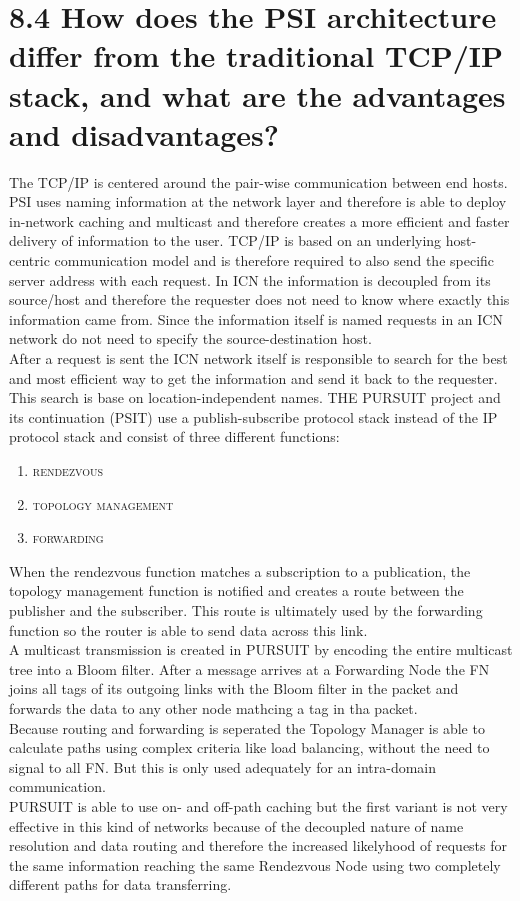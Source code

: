 \documentclass{article}
\begin{document}
	\section*{8.4 How does the PSI architecture differ from the traditional TCP/IP stack, and what are the advantages and disadvantages?}
	\begin{adjustwidth}{2em}{2em}
		The TCP/IP is centered around the pair-wise communication between end hosts. PSI uses naming information at the network layer and therefore is able to deploy in-network caching and multicast and therefore creates a more efficient and faster delivery of information to the user. TCP/IP is based on an underlying host-centric communication model and is therefore required to also send the specific server address with each request. In ICN the information is decoupled from its source/host and therefore the requester does not need to know where exactly this information came from. Since the information itself is named requests in an ICN network do not need to specify the source-destination host. \\
		After a request is sent the ICN network itself is responsible to search for the best and most efficient way to get the information and send it back to the requester. This search is base on location-independent names.
		THE PURSUIT project and its continuation (PSIT) use a publish-subscribe protocol stack instead of the IP protocol stack and consist of three different functions:
		\begin{enumerate}[\small \textbullet]
			\item \textsc{rendezvous}
			\item \textsc{topology management}
			\item \textsc{forwarding}
		\end{enumerate}
		When the rendezvous function matches a subscription to a publication, the topology management function is notified and creates a route between the publisher and the subscriber. This route is ultimately used by the forwarding function so the router is able to send data across this link. \\
		A multicast transmission is created in PURSUIT by encoding the entire multicast tree into a Bloom filter. After a message arrives at a Forwarding Node the FN joins all tags of its outgoing links with the Bloom filter in the packet and forwards the data to any other node mathcing a tag in tha packet. \\
		Because routing and forwarding is seperated the Topology Manager is able to calculate paths using complex criteria like load balancing, without the need to signal to all FN. But this is only used adequately for an intra-domain communication. \\
		PURSUIT is able to use on- and off-path caching but the first variant is not very effective in this kind of networks because of the decoupled nature of name resolution and data routing and therefore the increased likelyhood of requests for the same information reaching the same Rendezvous Node using two completely different paths for data transferring.
	\end{adjustwidth}
	
\end{document}
